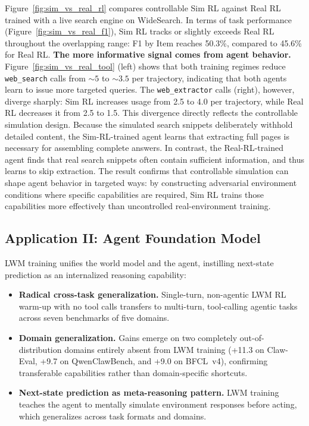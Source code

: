 Figure~\ref{fig:sim_vs_real_rl} compares controllable Sim RL against Real RL trained with a live search engine on WideSearch.
In terms of task performance (Figure~\ref{fig:sim_vs_real_f1}), Sim RL tracks or slightly exceeds Real RL throughout the overlapping range: F1 by Item reaches 50.3\%, compared to 45.6\% for Real RL.
\textbf{The more informative signal comes from agent behavior.}
Figure~\ref{fig:sim_vs_real_tool} (left) shows that both training regimes reduce \texttt{web\_search} calls from ${\sim}5$ to ${\sim}3.5$ per trajectory, indicating that both agents learn to issue more targeted queries.
The \texttt{web\_extractor} calls (right), however, diverge sharply: Sim RL increases usage from 2.5 to 4.0 per trajectory, while Real RL decreases it from 2.5 to 1.5.
This divergence directly reflects the controllable simulation design.
Because the simulated search snippets deliberately withhold detailed content, the Sim-RL-trained agent learns that extracting full pages is necessary for assembling complete answers.
In contrast, the Real-RL-trained agent finds that real search snippets often contain sufficient information, and thus learns to skip extraction.
The result confirms that controllable simulation can shape agent behavior in targeted ways: by constructing adversarial environment conditions where specific capabilities are required, Sim RL trains those capabilities more effectively than uncontrolled real-environment training.



\subsection{Application II: Agent Foundation Model}
\label{sec:app:foundation}

\begin{tcolorbox}[takeawaysbox]
\small
LWM training unifies the world model and the agent, instilling next-state prediction as an internalized reasoning capability:
\begin{itemize}[leftmargin=1.2em,itemsep=1pt,topsep=2pt]
\item \textbf{Radical cross-task generalization.} Single-turn, non-agentic LWM RL warm-up with no tool calls transfers to multi-turn, tool-calling agentic tasks across seven benchmarks of five domains.
\item \textbf{Domain generalization.} Gains emerge on two completely out-of-distribution domains entirely absent from LWM training (+11.3 on Claw-Eval, +9.7 on QwenClawBench, and +9.0 on BFCL~v4), confirming transferable capabilities rather than domain-specific shortcuts.
\item \textbf{Next-state prediction as meta-reasoning pattern.} LWM training teaches the agent to mentally simulate environment responses before acting, which generalizes across task formats and domains.
\end{itemize}
\end{tcolorbox}

